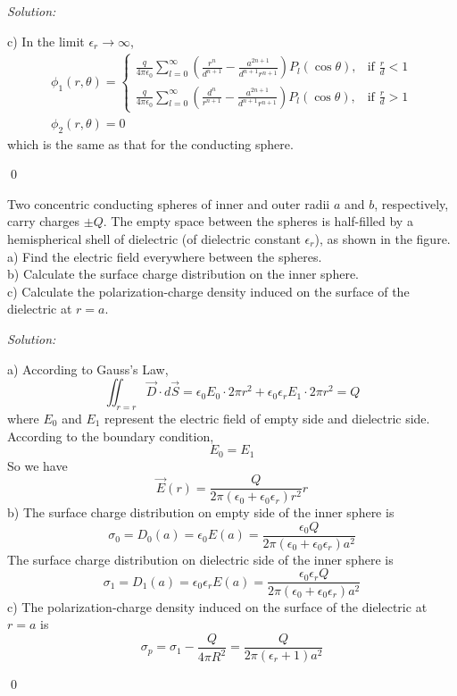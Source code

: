 \documentclass[12pt]{article}
\newenvironment{problem}[2][Problem]{\begin{trivlist}
\item[\hskip \labelsep {\bfseries #1}\hskip \labelsep {\bfseries #2.}]}{\end{trivlist}}
\newenvironment{sol}
    {\emph{Solution:}
    }
    {
    \qed
    }
\begin{document}
\begin{sol}
c) In the limit $\epsilon_r\to\infty$,
\begin{gather*}
\phi_1(r,\theta)=\left\{\begin{array}{ll}
\frac{q}{4\pi\epsilon_0}\sum_{l=0}^{\infty}(\frac{r^n}{d^{n+1}}-\frac{a^{2n+1}}{d^{n+1}r^{n+1}})P_l(\cos\theta),&\text{if }\frac{r}{d}<1\\
\frac{q}{4\pi\epsilon_0}\sum_{l=0}^{\infty}(\frac{d^n}{r^{n+1}}-\frac{a^{2n+1}}{d^{n+1}r^{n+1}})P_l(\cos\theta),&\text{if }\frac{r}{d}>1
\end{array}\right.\\
\phi_2(r,\theta)=0
\end{gather*}
which is the same as that for the conducting sphere.
\end{sol}

\begin{problem}{4}
Two concentric conducting spheres of inner and outer radii $a$ and $b$, respectively, carry charges $\pm Q$. The empty space between the spheres is half-filled by a hemispherical shell of dielectric (of dielectric constant $\epsilon_r$), as shown in the figure.\\
a) Find the electric field everywhere between the spheres.\\
b) Calculate the surface charge distribution on the inner sphere.\\
c) Calculate the polarization-charge density induced on the surface of the dielectric at $r=a$.
\end{problem}
\begin{sol}
a) According to Gauss's Law,
\[
\iint_{r=r}\vec{D}\cdot d\vec{S}=\epsilon_0E_0\cdot2\pi r^2+\epsilon_0\epsilon_rE_1\cdot2\pi r^2=Q
\]
where $E_0$ and $E_1$ represent the electric field of empty side and dielectric side.\\
According to the boundary condition,
\[
E_0=E_1
\]
So we have
\[
\vec{E}(r)=\frac{Q}{2\pi(\epsilon_0+\epsilon_0\epsilon_r)r^2}\hat{r}
\]
b) The surface charge distribution on empty side of the inner sphere is
\[
\sigma_0=D_0(a)=\epsilon_0E(a)=\frac{\epsilon_0Q}{2\pi(\epsilon_0+\epsilon_0\epsilon_r)a^2}
\]
The surface charge distribution on dielectric side of the inner sphere is
\[
\sigma_1=D_1(a)=\epsilon_0\epsilon_rE(a)=\frac{\epsilon_0\epsilon_rQ}{2\pi(\epsilon_0+\epsilon_0\epsilon_r)a^2}
\]
c) The polarization-charge density induced on the surface of the dielectric at $r=a$ is
\[
\sigma_p=\sigma_1-\frac{Q}{4\pi R^2}=\frac{Q}{2\pi(\epsilon_r+1)a^2}
\]
\end{sol}
\end{document}
